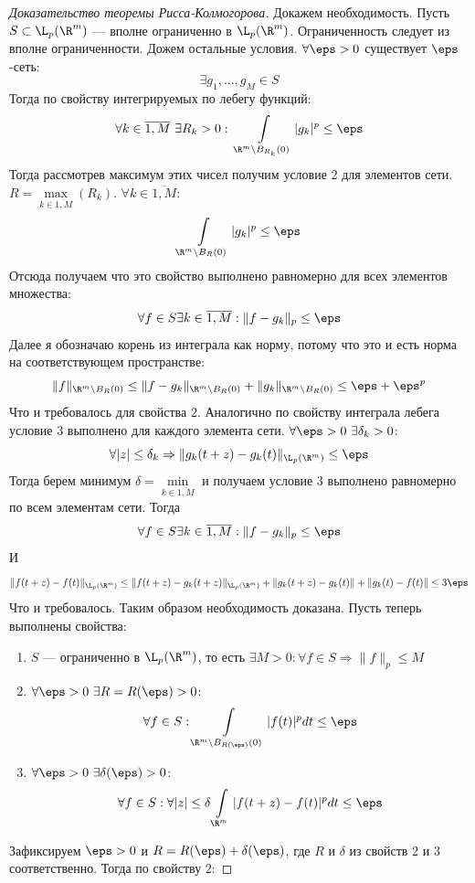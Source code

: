 \begin{proof}[Доказательство теоремы Рисса-Колмогорова]
	Докажем необходимость. Пусть $S \subset \L_p(\R^m)$ --- вполне ограниченно в $\L_p(\R^m)$. Ограниченность следует из вполне ограниченности.  Дожем остальные условия. $\forall \eps > 0$ существует $\eps$-сеть:
	$$
	\exists g_1, \dots, g_M \in S
	$$
	Тогда по свойству интегрируемых по лебегу функций:
	$$
	\forall k \in \overline{1, M} \ \exists R_k > 0: \ \int\limits_{\R^m \setminus B_{R_k}(0)} |g_k|^p \leq \eps
	$$
	Тогда рассмотрев максимум этих чисел получим условие 2 для элементов сети. $R = \max\limits_{k \in \overline{1, M}}(R_k)$. $\forall k \in \overline{1, M}$:
	$$
	\int\limits_{\R^m \setminus B_{R}(0)} |g_k|^p \leq \eps
	$$
	Отсюда получаем что это свойство выполнено равномерно для всех элементов множества:
	$$
	\forall f \in S \exists k \in \overline{1, M}: \|f - g_k\|_p \leq \eps
	$$
	Далее я обозначаю корень из интеграла как норму, потому что это и есть норма на соответствующем пространстве:
	$$
	\|f\|_{\R^m \setminus B_{R}(0)} \leq \|f - g_k\|_{\R^m \setminus B_{R}(0)}  + \|g_k\|_{\R^m \setminus B_{R}(0)}  \leq \eps + \eps^p
	$$
	Что и требовалось для свойства 2. Аналогично по свойству интеграла лебега условие 3 выполнено для каждого элемента сети. $\forall \eps > 0 \ \exists \delta_k > 0$:
	$$
	\forall |z| \leq \delta_k \Rightarrow \|g_k(t+z) - g_k(t)\|_{\L_p(\R^m)} \leq \eps
	$$
	Тогда берем минимум $\delta = \min\limits_{k \in \overline{1, M}}$ и получаем условие 3 выполнено равномерно по всем элементам сети. Тогда 
	$$
	\forall f \in S \exists k \in \overline{1, M}: \|f - g_k\|_p \leq \eps
	$$
	И
	$$
	\|f(t+z) - f(t)\|_{\L_p(\R^m)}\leq \|f(t+z) - g_k(t+z)\|_{\L_p(\R^m)} + \|g_k(t+z) - g_k(t)\| + \|g_k(t) - f(t)\| \leq 3\eps
	$$
	Что и требовалось. Таким образом необходимость доказана. Пусть теперь выполнены свойства:
	\begin{enumerate}
		\item $S$ --- ограниченно в $\L_p(\R^m)$, то есть $\exists M > 0: \forall f \in S \Rightarrow \|f\|_p \leq M$
		\item $\forall \eps > 0 \ \exists R = R(\eps) > 0$: 
		$$
		\forall f \in S: \int\limits_{\R^m \setminus B_{R(\eps)}(0)} |f(t)|^pdt \leq \eps
		$$
		\item $\forall \eps > 0 \ \exists \delta(\eps) > 0$:
		$$
		\forall f \in S : \forall |z| \leq \delta \int\limits_{\R^m} |f(t + z) - f(t)|^p dt  \leq \eps
		$$
	\end{enumerate}
	Зафиксируем $\eps >0$ и $R = R(\eps) +\delta(\eps)$, где $R$ и $\delta$ из свойств 2 и 3 соответственно. Тогда по свойству 2: 

\end{proof}
